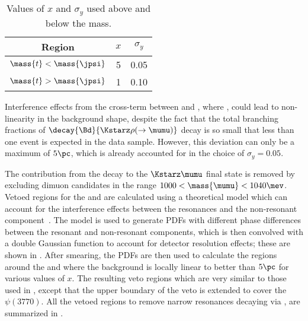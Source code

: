 \begin{table}
  \caption[Values of $x$ and $\sigma_y$ used]
  {
    Values of $x$ and $\sigma_y$ used above and below the \jpsi mass.
  }
  \label{tab:db:xsigmay}
  \begin{center}
    \begin{tabular}{ccc}\toprule
      Region & $x$ & $\sigma_y$ \\\midrule
      $\mass{t}<\mass{\jpsi}$ & 5 & 0.05 \\
      $\mass{t}>\mass{\jpsi}$ & 1 & 0.10 \\
      \bottomrule
    \end{tabular}
  \end{center}
\end{table}

Interference effects from the cross-term between
\btokstrmumu and \decay{\Bd}{\Kstarz\rho}, where \decay{\rho}{\mumu}, could lead to non-linearity
in the background shape, despite the fact that the total branching fractions of
$\decay{\Bd}{\Kstarz\rho(\to\mumu)}$ decay is so small that less than one event is expected in the
data sample.
However, this deviation can only be a maximum of \approx$5\pc$, which is already accounted for in
the choice of $\sigma_y=0.05$.

The contribution from the decay \decay{\phi}{\mumu} to the $\Kstarz\mumu$ final state is removed by
excluding dimuon candidates in the range $1000<\mass{\mumu}<1040\mev$.
Vetoed regions for the \jpsi and \psitwos are calculated using a theoretical
model which can account for the interference effects between the
\decay{\ccbar}{\mumu} resonances and the non-resonant \mumu component~\cite{Bobeth:2011nj}.
The model is used to generate \glspl{PDF} with different phase differences between the resonant and
non-resonant components, which is then convolved with a double Gaussian function to account for
detector resolution effects; these are shown in .
After smearing, the \glspl{PDF} are then used to
calculate the regions around the \jpsi and \psitwos where the
background is locally linear to better than $5\pc$ for various values of $x$.
The resulting veto regions which are very similar to those used in
, except that the upper boundary of the \psitwos veto is extended to cover
the $\psi(3770)$.
All the vetoed regions to remove narrow resonances decaying via , are summarized in
.


